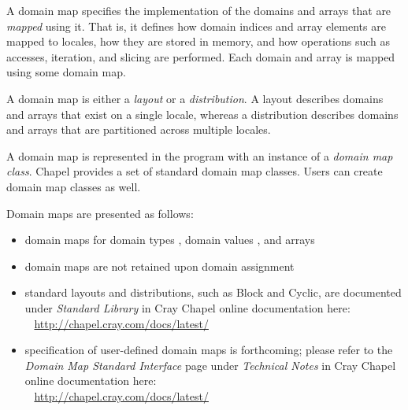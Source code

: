 \label{Domain_Maps}

A domain map specifies the implementation of the domains and arrays
that are \emph{mapped} using it. That is, it defines how domain indices
and array elements are mapped to locales, how they are stored in
memory, and how operations such as accesses, iteration, and slicing
are performed.  Each domain and array is mapped using some domain map.

A domain map is either a \emph{layout} or a \emph{distribution}.
A layout describes domains and arrays that exist on a single locale,
whereas a distribution describes domains and arrays that are
partitioned across multiple locales.

A domain map is represented in the program with an instance of
a \emph{domain map class}.
Chapel provides a set of standard domain map classes.
Users can create domain map classes as well.

Domain maps are presented as follows:
\begin{itemize}

\item domain maps for domain types ,
      domain values , and
      arrays 

\item domain maps are not retained upon domain assignment

\item standard layouts and distributions, such as Block and Cyclic,
are documented under \emph{Standard Library}
in Cray Chapel online documentation here:
\\ %
\mbox{$$ $$ $$} %
\url{http://chapel.cray.com/docs/latest/}

\item specification of user-defined domain maps is forthcoming;
please refer to the \emph{Domain Map Standard Interface} page
under \emph{Technical Notes}
in Cray Chapel online documentation here:
\\ %
\mbox{$$ $$ $$} %
\url{http://chapel.cray.com/docs/latest/}

\end{itemize}


